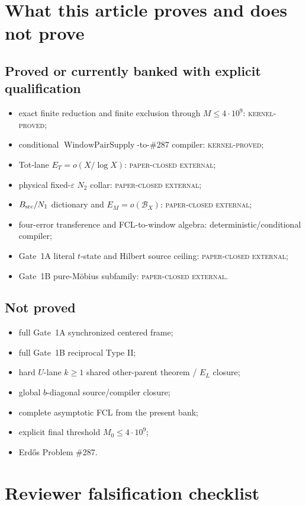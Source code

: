 \documentclass[11pt]{article}
\theoremstyle{definition}
\newcommand{\1}{\mathbf 1}
\newcommand{\BX}{\mathcal B_X}
\newcommand{\WPS}{\operatorname{WindowPairSupply}}
\newcommand{\paperclosed}{\textsc{paper-closed external}}
\newcommand{\kernelproved}{\textsc{kernel-proved}}
\begin{document}
\section{What this article proves and does not prove}

\subsection*{Proved or currently banked with explicit qualification}
\begin{itemize}[leftmargin=*]
\item exact finite reduction and finite exclusion through $M\le4\cdot10^9$: \kernelproved;
\item conditional $\WPS$-to-\#287 compiler: \kernelproved;
\item Tot-lane $E_T=o(X/\log X)$: \paperclosed;
\item physical fixed-$\varepsilon$ $N_2$ collar: \paperclosed;
\item $B_{\rm src}/N_1$ dictionary and $E_M=o(\BX)$: \paperclosed;
\item four-error transference and FCL-to-window algebra: deterministic/conditional compiler;
\item Gate~1A literal $t$-state and Hilbert source ceiling: \paperclosed;
\item Gate~1B pure-Möbius subfamily: \paperclosed.
\end{itemize}

\subsection*{Not proved}
\begin{itemize}[leftmargin=*]
\item full Gate~1A synchronized centered frame;
\item full Gate~1B reciprocal Type II;
\item hard $U$-lane $k\ge1$ shared other-parent theorem / $E_L$ closure;
\item global $b$-diagonal source/compiler closure;
\item complete asymptotic FCL from the present bank;
\item explicit final threshold $M_0\le4\cdot10^9$;
\item Erd\H{o}s Problem \#287.
\end{itemize}

\section{Reviewer falsification checklist}
\end{document}

